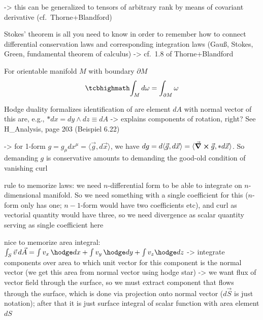 \documentclass[../class_mech_main.tex]{subfiles}
\begin{document}
-> this can be generalized to tensors of arbitrary rank by means of covariant derivative (cf.~Thorne+Blandford)



Stokes' theorem is all you need to know in order to remember how to connect differential conservation laws and corresponding integration laws (Gauß, Stokes, Green, fundamental theorem of calculus) -> cf.~1.8 of Thorne+Blandford

\begin{thm}
    For orientable manifold $M$ with boundary $\partial M$
    \begin{equation}
        \eqbox{
            \int_M d\omega = \int_{\partial M} \omega
        }
    \end{equation}
\end{thm}




Hodge duality formalizes identification of are element $dA$ with normal vector of this are, e.g., $* dx = dy \wedge dz \equiv dA$ -> explains components of rotation, right? See H\_Analysis, page 203 (Beispiel 6.22)

-> for 1-form $g = g_\mu dx^\mu = \langle \vec{g}, d\vec{x} \rangle$, we have $dg = d \langle \vec{g}, d\vec{x} \rangle = \langle \curl \vec{g}, * d\vec{x} \rangle$. So demanding $g$ is conservative amounts to demanding the good-old condition of vanishing curl


rule to memorize laws: we need $n$-differential form to be able to integrate on $n$-dimensional manifold. So we need something with a single coefficient for this ($n$-form only has one; $n - 1$-form would have two coefficients etc), and curl as vectorial quantity would have three, so we need divergence as scalar quantity serving as single coefficient here


nice to memorize area integral: $\int_S \vec{v} \, d\vec{A} = \int v_x \, \hodge dx + \int v_y \, \hodge dy + \int v_z \hodge dz$ -> integrate components over area to which unit vector for this component is the normal vector (we get this area from normal vector using hodge star)  -> we want flux of vector field through the surface, so we must extract component that flows through the surface, which is done via projection onto normal vector ($d\vec{S}$ is just notation); after that it is just surface integral of scalar function with area element $dS$
\end{document}
